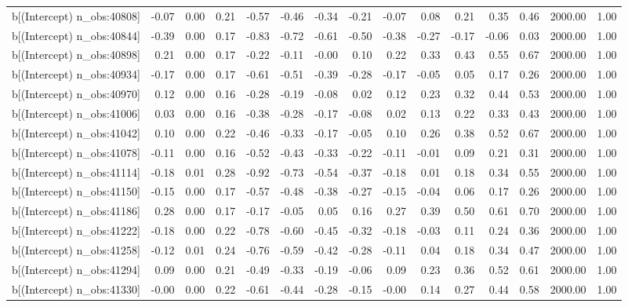 \begin{table}[ht]
\begin{tabular}{rrrrrrrrrrrrrrr}
  b[(Intercept) n\_obs:40808] & -0.07 & 0.00 & 0.21 & -0.57 & -0.46 & -0.34 & -0.21 & -0.07 & 0.08 & 0.21 & 0.35 & 0.46 & 2000.00 & 1.00 \\ 
  b[(Intercept) n\_obs:40844] & -0.39 & 0.00 & 0.17 & -0.83 & -0.72 & -0.61 & -0.50 & -0.38 & -0.27 & -0.17 & -0.06 & 0.03 & 2000.00 & 1.00 \\ 
  b[(Intercept) n\_obs:40898] & 0.21 & 0.00 & 0.17 & -0.22 & -0.11 & -0.00 & 0.10 & 0.22 & 0.33 & 0.43 & 0.55 & 0.67 & 2000.00 & 1.00 \\ 
  b[(Intercept) n\_obs:40934] & -0.17 & 0.00 & 0.17 & -0.61 & -0.51 & -0.39 & -0.28 & -0.17 & -0.05 & 0.05 & 0.17 & 0.26 & 2000.00 & 1.00 \\ 
  b[(Intercept) n\_obs:40970] & 0.12 & 0.00 & 0.16 & -0.28 & -0.19 & -0.08 & 0.02 & 0.12 & 0.23 & 0.32 & 0.44 & 0.53 & 2000.00 & 1.00 \\ 
  b[(Intercept) n\_obs:41006] & 0.03 & 0.00 & 0.16 & -0.38 & -0.28 & -0.17 & -0.08 & 0.02 & 0.13 & 0.22 & 0.33 & 0.43 & 2000.00 & 1.00 \\ 
  b[(Intercept) n\_obs:41042] & 0.10 & 0.00 & 0.22 & -0.46 & -0.33 & -0.17 & -0.05 & 0.10 & 0.26 & 0.38 & 0.52 & 0.67 & 2000.00 & 1.00 \\ 
  b[(Intercept) n\_obs:41078] & -0.11 & 0.00 & 0.16 & -0.52 & -0.43 & -0.33 & -0.22 & -0.11 & -0.01 & 0.09 & 0.21 & 0.31 & 2000.00 & 1.00 \\ 
  b[(Intercept) n\_obs:41114] & -0.18 & 0.01 & 0.28 & -0.92 & -0.73 & -0.54 & -0.37 & -0.18 & 0.01 & 0.18 & 0.34 & 0.55 & 2000.00 & 1.00 \\ 
  b[(Intercept) n\_obs:41150] & -0.15 & 0.00 & 0.17 & -0.57 & -0.48 & -0.38 & -0.27 & -0.15 & -0.04 & 0.06 & 0.17 & 0.26 & 2000.00 & 1.00 \\ 
  b[(Intercept) n\_obs:41186] & 0.28 & 0.00 & 0.17 & -0.17 & -0.05 & 0.05 & 0.16 & 0.27 & 0.39 & 0.50 & 0.61 & 0.70 & 2000.00 & 1.00 \\ 
  b[(Intercept) n\_obs:41222] & -0.18 & 0.00 & 0.22 & -0.78 & -0.60 & -0.45 & -0.32 & -0.18 & -0.03 & 0.11 & 0.24 & 0.36 & 2000.00 & 1.00 \\ 
  b[(Intercept) n\_obs:41258] & -0.12 & 0.01 & 0.24 & -0.76 & -0.59 & -0.42 & -0.28 & -0.11 & 0.04 & 0.18 & 0.34 & 0.47 & 2000.00 & 1.00 \\ 
  b[(Intercept) n\_obs:41294] & 0.09 & 0.00 & 0.21 & -0.49 & -0.33 & -0.19 & -0.06 & 0.09 & 0.23 & 0.36 & 0.52 & 0.61 & 2000.00 & 1.00 \\ 
  b[(Intercept) n\_obs:41330] & -0.00 & 0.00 & 0.22 & -0.61 & -0.44 & -0.28 & -0.15 & -0.00 & 0.14 & 0.27 & 0.44 & 0.58 & 2000.00 & 1.00 \\ 

\end{tabular}
\end{table}
